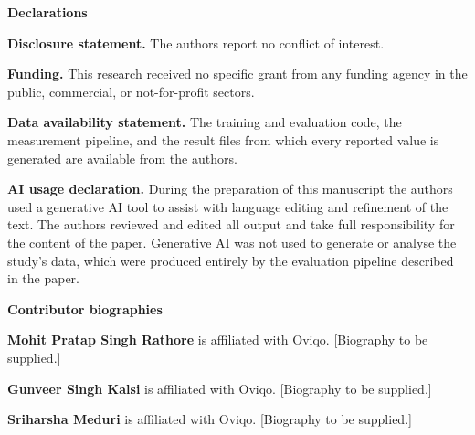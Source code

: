 \documentclass[11pt]{article}
\begin{document}
\vspace{10mm}

\noindent\textbf{Declarations}

\vspace{3mm}

\noindent\textbf{Disclosure statement.} The authors report no conflict of
interest.

\vspace{3mm}

\noindent\textbf{Funding.} This research received no specific grant from any
funding agency in the public, commercial, or not-for-profit sectors.

\vspace{3mm}

\noindent\textbf{Data availability statement.} The training and evaluation code,
the measurement pipeline, and the result files from which every reported value is
generated are available from the authors.

\vspace{3mm}

\noindent\textbf{AI usage declaration.} During the preparation of this manuscript
the authors used a generative AI tool to assist with language editing and
refinement of the text. The authors reviewed and edited all output and take full
responsibility for the content of the paper. Generative AI was not used to
generate or analyse the study's data, which were produced entirely by the
evaluation pipeline described in the paper.

\vspace{10mm}

\noindent\textbf{Contributor biographies}

\vspace{3mm}

\noindent\textbf{Mohit Pratap Singh Rathore} is affiliated with Oviqo. [Biography to be supplied.]

\vspace{3mm}

\noindent\textbf{Gunveer Singh Kalsi} is affiliated with Oviqo.
[Biography to be supplied.]

\vspace{3mm}

\noindent\textbf{Sriharsha Meduri} is affiliated with Oviqo.
[Biography to be supplied.]
\end{document}
